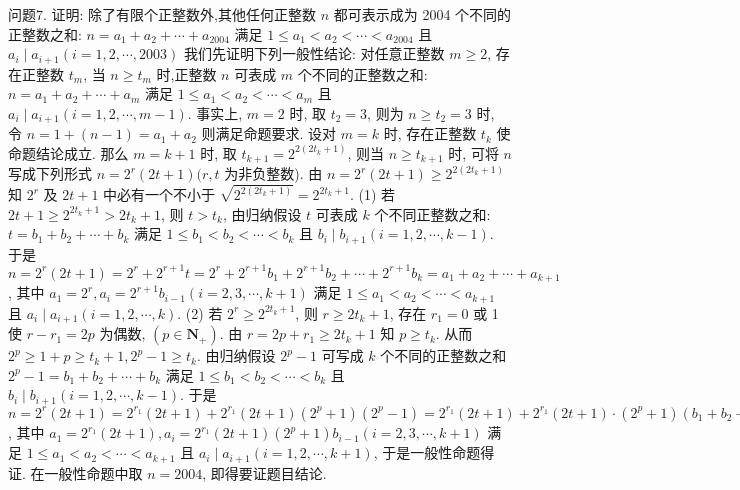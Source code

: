 问题7. 证明: 除了有限个正整数外,其他任何正整数 $n$ 都可表示成为 2004 个不同的正整数之和: $n=a_1+a_2+\cdots+a_{2004}$ 满足 $1 \leqslant a_1<a_2<\cdots<a_{2004}$ 且 $a_i \mid a_{i+1}(i=1,2, \cdots, 2003)$ 
我们先证明下列一般性结论: 对任意正整数 $m \geqslant 2$, 存在正整数 $t_m$, 当 $n \geqslant t_m$ 时,正整数 $n$ 可表成 $m$ 个不同的正整数之和: $n=a_1+a_2+\cdots+a_m$ 满足 $1 \leqslant a_1<a_2<\cdots<a_m$ 且 $a_i \mid a_{i+1}(i=1,2, \cdots, m-1)$. 事实上, $m=2$ 时, 取 $t_2=3$, 则为 $n \geqslant t_2=3$ 时, 令 $n=1+(n-1)=a_1+a_2$ 则满足命题要求.
设对 $m=k$ 时, 存在正整数 $t_k$ 使命题结论成立.
那么 $m=k+1$ 时, 取 $t_{k+1}=2^{2\left(2 t_k+1\right)}$, 则当 $n \geqslant t_{k+1}$ 时, 可将 $n$ 写成下列形式 $n=2^r(2 t+1)(r, t$ 为非负整数). 由 $n=2^r(2 t+1) \geqslant 2^{2\left(2 t_k+1\right)}$ 知 $2^r$ 及 $2 t+1$ 中必有一个不小于 $\sqrt{2^{2\left(2 t_k+1\right)}} =2^{2 t_k+1}$. (1) 若 $2 t+1 \geqslant 2^{2 t_k+1}>2 t_k+1$, 则 $t>t_k$, 由归纳假设 $t$ 可表成 $k$ 个不同正整数之和: $t=b_1+b_2+\cdots+b_k$ 满足 $1 \leqslant b_1<b_2<\cdots<b_k$ 且 $b_i \mid b_{i+1}(i=1,2, \cdots, k-1)$. 于是 $n=2^r(2 t+1)=2^r+2^{r+1} t=2^r+2^{r+1} b_1 +2^{r+1} b_2+\cdots+2^{r+1} b_k=a_1+a_2+\cdots+a_{k+1}$, 其中 $a_1=2^r, a_i=2^{r+1} b_{i-1}(i= 2,3, \cdots, k+1)$ 满足 $1 \leqslant a_1<a_2<\cdots<a_{k+1}$ 且 $a_i \mid a_{i+1}(i=1,2, \cdots, k)$. (2) 若 $2^r \geqslant 2^{2 t_k+1}$, 则 $r \geqslant 2 t_k+1$, 存在 $r_1=0$ 或 1 使 $r-r_1=2 p$ 为偶数, $\left(p \in \mathbf{N}_{+}\right)$. 由 $r=2 p+r_1 \geqslant 2 t_k+1$ 知 $p \geqslant t_k$. 从而 $2^p \geqslant 1+p \geqslant t_k+1,2^p- 1 \geqslant t_k$. 由归纳假设 $2^p-1$ 可写成 $k$ 个不同的正整数之和 $2^p-1=b_1+b_2+\cdots +b_k$ 满足 $1 \leqslant b_1<b_2<\cdots<b_k$ 且 $b_i \mid b_{i+1}(i=1,2, \cdots, k-1)$. 于是 $n= 2^r(2 t+1)=2^{r_1}(2 t+1)+2^{r_1}(2 t+1)\left(2^p+1\right)\left(2^p-1\right)=2^{r_1}(2 t+1)+2^{r_1} (2 t+1) \cdot\left(2^p+1\right)\left(b_1+b_2+\cdots+b_k\right)=a_1+a_2+\cdots+a_{k+1}$, 其中 $a_1= 2^{r_1}(2 t+1), a_i=2^{r_1}(2 t+1)\left(2^p+1\right) b_{i-1}(i=2,3, \cdots, k+1)$ 满足 $1 \leqslant a_1< a_2<\cdots<a_{k+1}$ 且 $a_i \mid a_{i+1}(i=1,2, \cdots, k+1)$, 于是一般性命题得证.
在一般性命题中取 $n=2004$, 即得要证题目结论.



